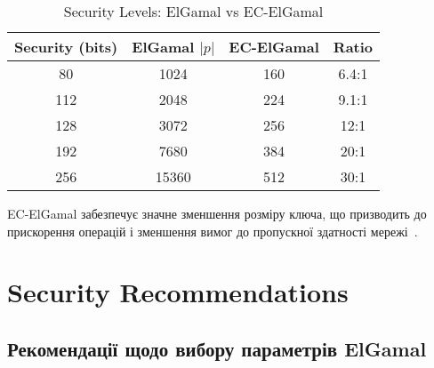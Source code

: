 \begin{table}[ht]
    \centering
    \begin{tabular}{|c|c|c|c|}
        \hline
        \textbf{Security (bits)} & \textbf{ElGamal $|p|$} & \textbf{EC-ElGamal} & \textbf{Ratio} \\
        \hline
        80                       & 1024                   & 160                 & 6.4:1          \\
        112                      & 2048                   & 224                 & 9.1:1          \\
        128                      & 3072                   & 256                 & 12:1           \\
        192                      & 7680                   & 384                 & 20:1           \\
        256                      & 15360                  & 512                 & 30:1           \\
        \hline
    \end{tabular}
    \caption{Security Levels: ElGamal vs EC-ElGamal}
\end{table}

EC-ElGamal забезпечує значне зменшення розміру ключа, що призводить до прискорення операцій і зменшення вимог до 
пропускної здатності мережі~\cite{hankerson2006guide}.

\section{Security Recommendations}

\subsection{Рекомендації щодо вибору параметрів ElGamal}

